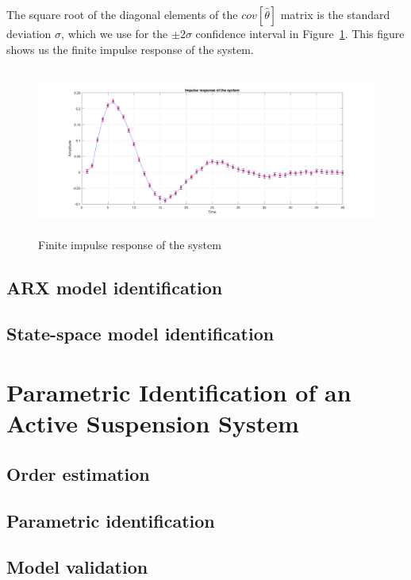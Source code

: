 \documentclass{scrartcl}
\newcommand*{\matlabcode}[3]{\begin{figure}[h!]\end{figure}}
\begin{document}
The square root of the diagonal elements of the $cov[\hat{\theta}]$ matrix is the standard deviation $ \sigma $, which we use for the $ \pm 2 \sigma $ confidence interval in Figure~\ref{fig:fir_response}. This figure shows us the finite impulse response of the system.

\begin{figure}[h]
	\centering
	\includegraphics[height=5.5cm]{figures/fir_response.png}
	\caption{Finite impulse response of the system}\label{fig:fir_response}
\end{figure}

\matlabcode{../matlab/ce2/FIR_model_identification.m}{Computing the finite impulse response of the system}{lst:FIR}

\newpage
\subsection{ARX model identification}

\newpage
\subsection{State-space model identification}

\newpage
\section{Parametric Identification of an Active Suspension System}

\newpage
\subsection{Order estimation}

\newpage
\subsection{Parametric identification}

\newpage
\subsection{Model validation}
\end{document}

